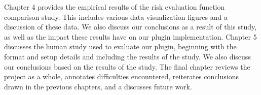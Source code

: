 Chapter 4 provides the empirical results of the risk evaluation function
comparison study.  This includes various data visualization figures and
a discussion of these data.  We also discuss our conclusions as a result
of this study, as well as the impact these results have on our plugin 
implementation.  Chapter 5 discusses the human study used to evaluate our
plugin, beginning with the format and setup details and including the results
of the study.  We also discuss our conclusions based on the results of the study.
The final chapter reviews the project as a whole, annotates difficulties 
encountered, reiterates conclusions drawn in the previous chapters, 
and a discusses future work.